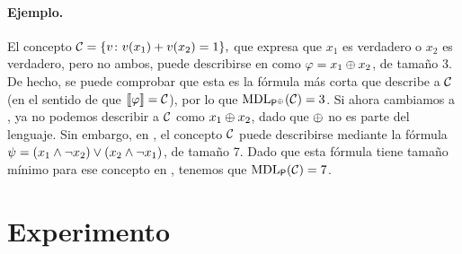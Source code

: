 \paragraph*{Ejemplo.}El concepto $
\mathcal{C}=\{v\colon v(x_1)+v(x_2)=1\},
$
que expresa que $x_1$ es verdadero o $x_2$ es verdadero, pero no ambos, puede describirse en \gramboolxor como $\varphi=x_{1} \oplus x_{2}$, de tamaño 3. De hecho, se puede comprobar que esta es la fórmula más corta que describe a $\mathcal{C}$ (en el sentido de que $\llbracket \varphi\rrbracket=\mathcal{C}$), por lo que ${\rm MDL}_{{\sf P}^\oplus}(\mathcal{C})=3$. Si ahora cambiamos a \grambool, ya no podemos describir a $\mathcal{C}$ como $x_{1} \oplus x_{2}$, dado que $\oplus$ no es parte del lenguaje. Sin embargo, en \grambool, el concepto $\mathcal{C}$ puede describirse mediante la fórmula $\psi=(x_{1} \wedge \neg x_{2}) \vee (x_{2} \wedge \neg x_{1})$, de tamaño 7. Dado que esta fórmula tiene tamaño mínimo para ese concepto en \grambool, tenemos que ${\rm MDL}_{{\sf P}}(\mathcal{C})=7$.


\section{Experimento}


\renewcommand*{\arraystretch}{1.2}
   
